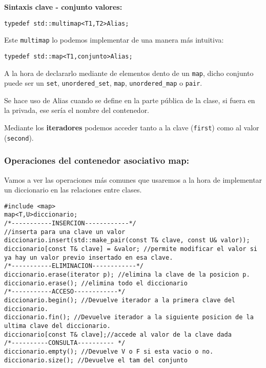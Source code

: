 \textbf{\large{Sintaxis clave - conjunto valores:}}

\begin{center}
  \begin{lstlisting}[frame=single]
                typedef std::multimap<T1,T2>Alias;
  \end{lstlisting}
\end{center}


Este \texttt{multimap} lo podemos implementar de una manera más intuitiva:
\begin{center}
  \begin{lstlisting}[frame=single]
              typedef std::map<T1,conjunto>Alias;
  \end{lstlisting}
\end{center}

A la hora de declararlo mediante  de elementos dento de un \texttt{map}, dicho conjunto puede ser un \texttt{set}, \texttt{unordered\_set},
   \texttt{map}, \texttt{unordered\_map} o \texttt{pair}.

Se hace uso de Alias cuando se define en la parte pública de la clase, si fuera en la privada, ese sería el nombre
del contenedor.

Mediante los \textbf{iteradores} podemos acceder tanto a la clave (\texttt{first}) como al valor (\texttt{second}).

\subsubsection{Operaciones del contenedor asociativo map:}
Vamos a ver las operaciones más comunes que usaremos a la hora de implementar un diccionario en las relaciones entre clases.
\begin{center}
  \begin{lstlisting}[frame = single]
#include <map>
map<T,U>diccionario;
/*-----------INSERCION------------*/
//inserta para una clave un valor
diccionario.insert(std::make_pair(const T& clave, const U& valor));
diccionario[const T& clave] = &valor; //permite modificar el valor si ya hay un valor previo insertado en esa clave.
/*-----------ELIMINACION------------*/
diccionario.erase(iterator p); //elimina la clave de la posicion p.
diccionario.erase(); //elimina todo el diccionario
/*-----------ACCESO------------*/
diccionario.begin(); //Devuelve iterador a la primera clave del diccionario.
diccionario.fin(); //Devuelve iterador a la siguiente posicion de la ultima clave del diccionario.
diccionario[const T& clave];//accede al valor de la clave dada
/*----------CONSULTA---------- */
diccionario.empty(); //Devuelve V o F si esta vacio o no.
diccionario.size(); //Devuelve el tam del conjunto
  \end{lstlisting}
\end{center}

